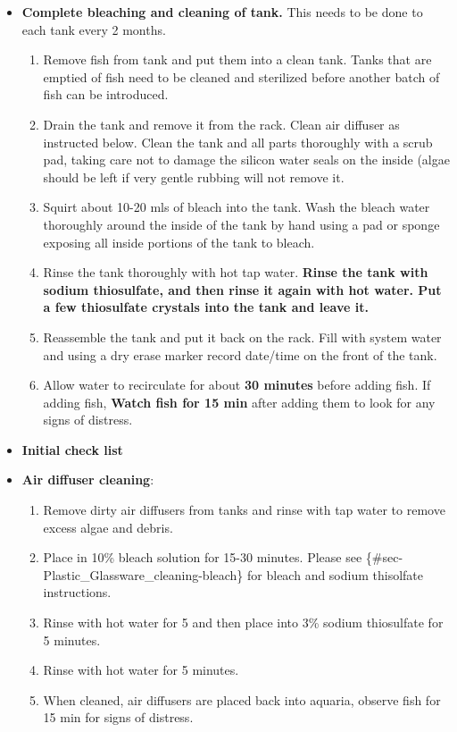 \documentclass[
  letterpaper,
  DIV=11,
  numbers=noendperiod]{scrreprt}
\providecommand{\tightlist}{%
  \setlength{\itemsep}{0pt}\setlength{\parskip}{0pt}}\usepackage{longtable,booktabs,array}
\begin{document}
\begin{itemize}
\item
  \textbf{Complete bleaching and cleaning of tank.} This needs to be
  done to each tank every 2 months.

  \begin{enumerate}
  \def\labelenumi{\arabic{enumi}.}
  \tightlist
  \item
    Remove fish from tank and put them into a clean tank. Tanks that are
    emptied of fish need to be cleaned and sterilized before another
    batch of fish can be introduced.
  \item
    Drain the tank and remove it from the rack. Clean air diffuser as
    instructed below. Clean the tank and all parts thoroughly with a
    scrub pad, taking care not to damage the silicon water seals on the
    inside (algae should be left if very gentle rubbing will not remove
    it.
  \item
    Squirt about 10-20 mls of bleach into the tank. Wash the bleach
    water thoroughly around the inside of the tank by hand using a pad
    or sponge exposing all inside portions of the tank to bleach.
  \item
    Rinse the tank thoroughly with hot tap water. \textbf{Rinse the tank
    with sodium thiosulfate, and then rinse it again with hot water. Put
    a few thiosulfate crystals into the tank and leave it.}
  \item
    Reassemble the tank and put it back on the rack. Fill with system
    water and using a dry erase marker record date/time on the front of
    the tank.
  \item
    Allow water to recirculate for about \textbf{30 minutes} before
    adding fish. If adding fish, \textbf{Watch fish for 15 min} after
    adding them to look for any signs of distress.
  \end{enumerate}
\item
  \textbf{Initial check list}
\item
  \textbf{Air diffuser cleaning}:

  \begin{enumerate}
  \def\labelenumi{\arabic{enumi}.}
  \tightlist
  \item
    Remove dirty air diffusers from tanks and rinse with tap water to
    remove excess algae and debris.
  \item
    Place in 10\% bleach solution for 15-30 minutes. Please see
    \{\#sec-Plastic\_Glassware\_cleaning-bleach\} for bleach and sodium
    thisolfate instructions.
  \item
    Rinse with hot water for 5 and then place into 3\% sodium
    thiosulfate for 5 minutes.
  \item
    Rinse with hot water for 5 minutes.
  \item
    When cleaned, air diffusers are placed back into aquaria, observe
    fish for 15 min for signs of distress.
  \end{enumerate}
\end{itemize}
\end{document}
